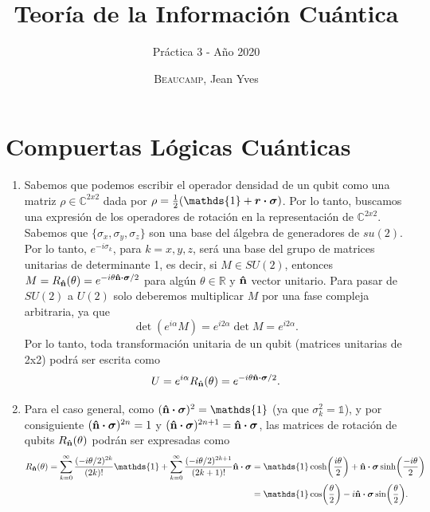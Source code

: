 \documentclass{scrartcl}
\title{Teoría de la Información Cuántica}
\subtitle{Práctica 3 - Año 2020}
\author{\textsc{Beaucamp}, Jean Yves}
\date{}
\newcommand{\inv}[1]{\frac{1}{#1}}
\newcommand{\realSet}{\mathbb{R}}
\newcommand{\complexSet}{\mathbb{C}}
\renewcommand{\vb}[1]{\bm{#1}}
\DeclareRobustCommand{\[}{\begin{equation}}
\DeclareRobustCommand{\]}{\end{equation}}
\begin{document}
\maketitle

\section{Compuertas Lógicas Cuánticas}
\begin{enumerate}
    
    \item Sabemos que podemos escribir el operador densidad de un qubit como una matriz $\rho \in \complexSet^{2x2}$ dada por $\rho = \inv{2} (\mathds{1} + \vb{r} \vdot \vb{\sigma})$. Por lo tanto, buscamos una expresión de los operadores de rotación en la representación de $\complexSet^{2x2}$. Sabemos que $\{ \sigma_x, \sigma_y, \sigma_z \}$ son una base del álgebra de generadores de $su(2)$. Por lo tanto, $e^{-i\sigma_k}$, para $k = x, y, z$, será una base del grupo de matrices unitarias de determinante 1, es decir, si $M \in SU(2)$, entonces $M = R_{\vu{n}}(\theta) = e^{-i\theta \vu{n} \vdot \vb{\sigma}/2}$ para algún $\theta \in \realSet$ y $\vu{n}$ vector unitario. Para pasar de $SU(2)$ a $U(2)$ solo deberemos multiplicar $M$ por una fase compleja arbitraria, ya que
    \[ \det(e^{i\alpha} M) = e^{i2\alpha} \det{M} = e^{i2\alpha}. \]
    Por lo tanto, toda transformación unitaria de un qubit (matrices unitarias de 2x2) podrá ser escrita como
    \[ U = e^{i\alpha} R_{\vu{n}}(\theta) = e^{-i\theta \vu{n} \vdot \vb{\sigma}/2}. \]
    
    
    
    \item Para el caso general, como $(\vu{n} \vdot \vb{\sigma})^2 = \mathds{1}$ (ya que $\sigma_k^2 = \mathds{1}$), y por consiguiente $(\vu{n} \vdot \vb{\sigma})^{2n} = 1$ y $(\vu{n} \vdot \vb{\sigma})^{2n+1} = \vu{n} \vdot \vb{\sigma}$, las matrices de rotación de qubits $R_{\vu{n}}(\theta)$ podrán ser expresadas como
    \begin{align}
        R_{\vu{n}}(\theta) = \sum_{k = 0}^\infty \frac{(-i\theta/2)^{2k}}{(2k)!} \mathds{1} + \sum_{k = 0}^\infty \frac{(-i\theta/2)^{2k+1}}{(2k+1)!} \vu{n} \vdot \vb{\sigma} &= \mathds{1} \cosh(\frac{i\theta}{2}) + \vu{n} \vdot \vb{\sigma} \sinh(\frac{-i\theta}{2}) \\
            &= \mathds{1} \cos(\frac{\theta}{2}) - i \vu{n} \vdot \vb{\sigma} \sin(\frac{\theta}{2}).
    \end{align}
    

\end{enumerate}
\end{document}
